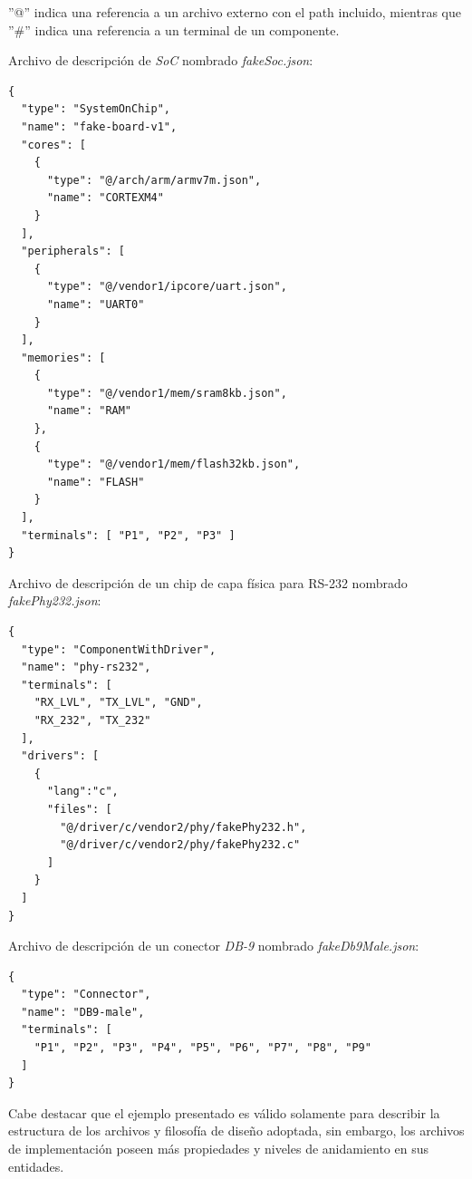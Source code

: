 ''@'' indica una referencia a un archivo externo con el path incluido, mientras que ''\#'' indica una referencia a un terminal de un componente.

Archivo de descripción de \emph{SoC} nombrado \emph{fakeSoc.json}:

\begin{verbatim}
{
  "type": "SystemOnChip",
  "name": "fake-board-v1",
  "cores": [
    {
      "type": "@/arch/arm/armv7m.json",
      "name": "CORTEXM4"
    }
  ],
  "peripherals": [
    {
      "type": "@/vendor1/ipcore/uart.json",
      "name": "UART0"
    }
  ],
  "memories": [
    {
      "type": "@/vendor1/mem/sram8kb.json",
      "name": "RAM"
    },
    {
      "type": "@/vendor1/mem/flash32kb.json",
      "name": "FLASH"
    }
  ],
  "terminals": [ "P1", "P2", "P3" ]
}
\end{verbatim}

Archivo de descripción de un chip de capa física para RS-232  nombrado \emph{fakePhy232.json}:

\begin{verbatim}
{
  "type": "ComponentWithDriver",
  "name": "phy-rs232",
  "terminals": [ 
    "RX_LVL", "TX_LVL", "GND",
    "RX_232", "TX_232"
  ],
  "drivers": [
    {
      "lang":"c",
      "files": [
        "@/driver/c/vendor2/phy/fakePhy232.h",
        "@/driver/c/vendor2/phy/fakePhy232.c"      
	  ]      
    }
  ]
}
\end{verbatim}

Archivo de descripción de un conector \emph{DB-9} nombrado \emph{fakeDb9Male.json}:

\begin{verbatim}
{
  "type": "Connector",
  "name": "DB9-male",
  "terminals": [ 
    "P1", "P2", "P3", "P4", "P5", "P6", "P7", "P8", "P9"
  ]
}
\end{verbatim}

Cabe destacar que el ejemplo presentado es válido solamente para describir la estructura de los archivos y filosofía de diseño adoptada, sin embargo, los archivos de implementación poseen más propiedades y niveles de anidamiento en sus entidades.
